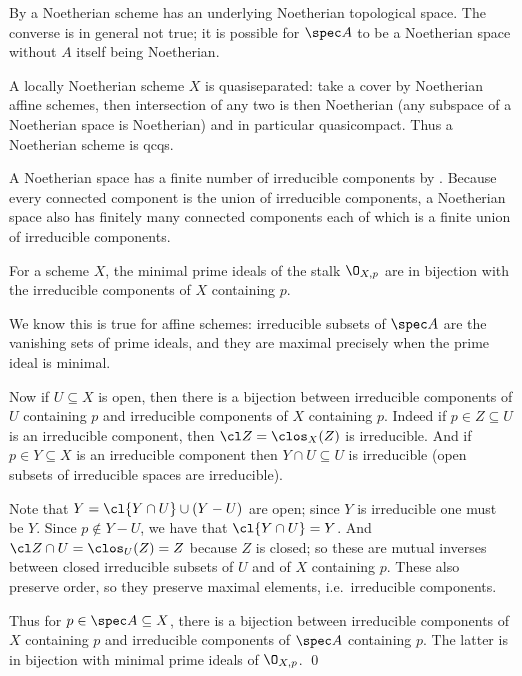 By  a Noetherian scheme has an underlying Noetherian topological space.
The converse is in general not true; it is possible for $\spec A$ to be a Noetherian space without $A$ itself being Noetherian.

A locally Noetherian scheme $X$ is quasiseparated: take a cover by Noetherian affine schemes, then intersection of any two is then Noetherian (any subspace of a Noetherian space is Noetherian)
and in particular quasicompact.
Thus a Noetherian scheme is qcqs.

A Noetherian space has a finite number of irreducible components by .
Because every connected component is the union of irreducible components, a Noetherian space also has finitely many connected components each of which is a finite union of irreducible components.

\blemm

    For a scheme $X$, the minimal prime ideals of the stalk $\O_{X,p}$ are in bijection with the irreducible components of $X$ containing $p$.

\elemm

\bproof

    We know this is true for affine schemes: irreducible subsets of $\spec A$ are the vanishing sets of prime ideals, and they are maximal precisely when the prime ideal is minimal.

    Now if $U\subseteq X$ is open, then there is a bijection between irreducible components of $U$ containing $p$ and irreducible components of $X$ containing $p$.
    Indeed if $p\in Z\subseteq U$ is an irreducible component, then $\cl Z=\clos_X(Z)$ is irreducible.
    And if $p\in Y\subseteq X$ is an irreducible component then $Y\cap U\subseteq U$ is irreducible (open subsets of irreducible spaces are irreducible).

    Note that $Y=\cl{Y\cap U}\cup(Y-U)$ are open; since $Y$ is irreducible one must be $Y$.
    Since $p\notin Y-U$, we have that $\cl{Y\cap U}=Y$.
    And $\cl Z\cap U=\clos_U(Z)=Z$ because $Z$ is closed; so these are mutual inverses between closed irreducible subsets of $U$ and of $X$ containing $p$.
    These also preserve order, so they preserve maximal elements, i.e.\ irreducible components.

    Thus for $p\in\spec A\subseteq X$, there is a bijection between irreducible components of $X$ containing $p$ and irreducible components of $\spec A$ containing $p$.
    The latter is in bijection with minimal prime ideals of $\O_{X,p}$.
    \qed

